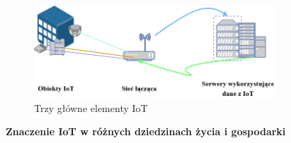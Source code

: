 \begin{figure}[h]
    \centering
    \includegraphics[width=0.8\textwidth]{pictures/IoT_basic.drawio.png}
    \caption{Trzy główne elementy IoT}
    \label{fig:Trzy główne elementy IoT}
\end{figure}

\vspace{1cm}

\textbf{Znaczenie IoT w różnych dziedzinach życia i gospodarki}

